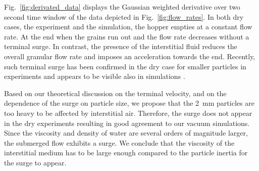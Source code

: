 \documentclass[twoside,twocolumn,9pt]{article}
\providecommand{\DIFdelbegin}{} %
\newcommand{\DIFscaledelfig}{0.5}
\newlength{\DIFdelgraphicswidth} %
\newlength{\DIFdelgraphicsheight} %
\newcommand{\DIFdelincludegraphics}[2][]{%
\sbox{\DIFdelgraphicsbox}{\DIFOincludegraphics[#1]{#2}}%
\settoboxwidth{\DIFdelgraphicswidth}{\DIFdelgraphicsbox} %
\settoboxtotalheight{\DIFdelgraphicsheight}{\DIFdelgraphicsbox} %
\scalebox{\DIFscaledelfig}{%
\parbox[b]{\DIFdelgraphicswidth}{\usebox{\DIFdelgraphicsbox}\\[-\baselineskip] \rule{\DIFdelgraphicswidth}{0em}}\llap{\resizebox{\DIFdelgraphicswidth}{\DIFdelgraphicsheight}{%
\setlength{\unitlength}{\DIFdelgraphicswidth}%
\begin{picture}(1,1)%
\thicklines\linethickness{2pt} %
{\color[rgb]{1,0,0}\put(0,0){\framebox(1,1){}}}%
{\color[rgb]{1,0,0}\put(0,0){\line( 1,1){1}}}%
{\color[rgb]{1,0,0}\put(0,1){\line(1,-1){1}}}%
\end{picture}%
}\hspace*{3pt}}} %
} %
\DeclareRobustCommand{\DIFdelbegin}{\DIFOdelbegin \let\includegraphics\DIFdelincludegraphics} %
\begin{document}
Fig.~\ref{fig:derivated_data} displays the Gaussian weighted derivative over two second time window of the data depicted in Fig.~\ref{fig:flow_rates}. In both dry cases, the experiment and the simulation, the hopper empties at a constant flow rate. 
At the end when the grains run out and the flow rate decreases without a terminal surge. 
In contrast, the presence of the interstitial fluid reduces the overall granular flow rate and imposes an acceleration towards the end. Recently, such terminal surge has been confirmed in the dry case for smaller particles in experiments \cite{koivistoSubmitted} and appears to be visible also in simulations \cite{DunatungaJFM15,SchwartzGM12}.

Based on our theoretical discussion on the terminal velocity, and on the dependence of the surge on particle size, we propose that the 2~mm particles are too heavy to be affected by interstitial air. Therefore, the surge does not appear in the dry experiments resulting in good agreement to our vacuum simulations. Since the viscosity and density of water are several orders of magnitude larger, the submerged flow exhibits a surge. We conclude that the viscosity of the interstitial medium has to be large enough compared to the particle inertia for the surge to appear.
%
\DIFdelbegin %
\end{document}
